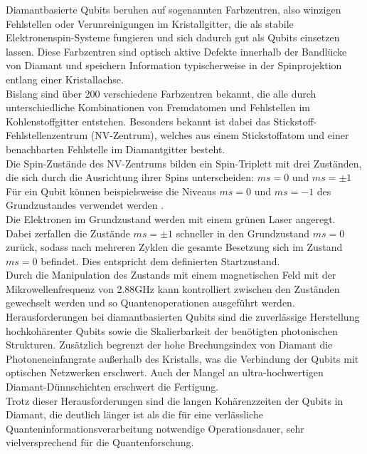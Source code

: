 Diamantbasierte Qubits beruhen auf sogenannten Farbzentren, also winzigen Fehlstellen oder Verunreinigungen im Kristallgitter, die als stabile Elektronenspin-Systeme fungieren und sich dadurch gut als Qubits einsetzen lassen. Diese Farbzentren sind optisch aktive Defekte innerhalb der Bandlücke von Diamant und speichern Information typischerweise in der Spinprojektion entlang einer Kristallachse. \\

Bislang sind über 200 verschiedene Farbzentren bekannt, die alle durch unterschiedliche Kombinationen von Fremdatomen und Fehlstellen im Kohlenstoffgitter entstehen. Besonders bekannt ist dabei das Stickstoff-Fehlstellenzentrum (NV-Zentrum), welches aus einem Stickstoffatom und einer benachbarten Fehlstelle im Diamantgitter besteht. \\

Die Spin-Zustände des NV-Zentrums bilden ein Spin-Triplett mit drei Zuständen, die sich durch die Ausrichtung ihrer Spins unterscheiden: $ms = 0$ und $ms = \pm 1$
Für ein Qubit können beispielsweise die Niveaus $ms = 0$ und $ms = -1$ des Grundzustandes verwendet werden . \\
Die Elektronen im Grundzustand werden mit einem grünen Laser angeregt. Dabei zerfallen die Zustände $ms = \pm 1$ schneller in den Grundzustand $ms=0$ zurück, sodass nach mehreren Zyklen die gesamte Besetzung sich im Zustand $ms=0$ befindet. Dies entspricht dem definierten Startzustand. \\

Durch die Manipulation des Zustands mit einem magnetischen Feld mit der Mikrowellenfrequenz von 2.88GHz kann kontrolliert zwischen den Zuständen gewechselt werden und so Quantenoperationen ausgeführt werden. \\

Herausforderungen  bei diamantbasierten Qubits sind die zuverlässige Herstellung hochkohärenter Qubits sowie die Skalierbarkeit der benötigten photonischen Strukturen. Zusätzlich begrenzt der hohe Brechungsindex von Diamant die Photoneneinfangrate außerhalb des Kristalls, was die Verbindung der Qubits mit optischen Netzwerken erschwert. Auch der Mangel an ultra-hochwertigen Diamant-Dünnschichten erschwert die Fertigung. \\

Trotz dieser Herausforderungen sind die langen Kohärenzzeiten der Qubits in Diamant, die deutlich länger ist als die für eine verlässliche Quanteninformationsverarbeitung notwendige Operationsdauer, sehr vielversprechend für die Quantenforschung. 

\cite{ulanov_diamantbasierte_2025}


\printbibliography

